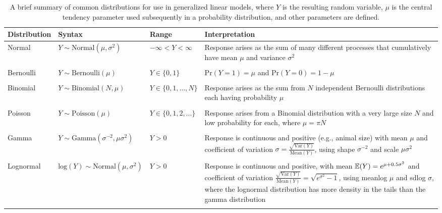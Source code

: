 \begin{table}
  \caption[List of common distributions]{A brief summary of common distributions for use in generalized linear models, where \(Y\) is the resulting random variable, \(\mu\) is the central tendency parameter used subsequently in a probability distribution, and other parameters are defined.}
\begin{center}
\begin{tabularx}{\textwidth}{ | X m{1.5in} X m{2in} | } 
  \hline
  Distribution & Syntax & Range & Interpretation \\ 
  \hline

  Normal & \( Y \sim \mathrm{Normal}(\mu,\sigma^2) \) & \( -\infty < Y < \infty \) & Response arises as the sum of many different processes that cumulatively have mean \(\mu\) and variance \(\sigma^2\) \\ & & & \\

  Bernoulli & \( Y \sim \mathrm{Bernoulli}(\mu) \) & \(Y \in \{0,1\} \) & \(\mathrm{Pr}(Y=1) = \mu\) and \(\mathrm{Pr}(Y=0) = 1-\mu\) \\ & & & \\

  Binomial & \( Y \sim \mathrm{Binomial}(N,\mu) \) & \(Y \in \{0,1,...,N\} \) & Response arises as the sum from \(N\) independent Bernoulli distributions each having probability \(\mu\) \\ & & & \\

  Poisson & \( Y \sim \mathrm{Poisson}(\mu) \) & \(Y \in \{0,1,2,...\} \) & Response arises from a Binomial distribution with a very large size \(N\) and low probability for each, where \(\mu = \pi N \) \\ & & & \\

  Gamma & \( Y \sim \mathrm{Gamma}(\sigma^{-2},\mu \sigma^2) \) & \( Y > 0 \) & Response is continuous and positive (e.g., animal size) with mean \(\mu\) and coefficient of variation \( \sigma =  \frac{\sqrt{\mathrm{Var}(Y)}}{\mathrm{Mean}(Y)} \), using shape \(\sigma^{-2}\) and scale \(\mu \sigma^2\) \\ & & & \\

  Lognormal & \( \mathrm{log}(Y) \sim \mathrm{Normal}( \mu,\sigma^2 ) \) & \( Y > 0 \) & Response is continuous and positive, with mean \(\operatorname{\mathbb{E}}(Y)=e^{\mu+0.5\sigma^2}\) and coefficient of variation \( \frac{\sqrt{\mathrm{Var}(Y)}}{\mathrm{Mean}(Y)} = \sqrt{e^{\sigma^2}-1} \), using meanlog \(\mu\) and sdlog \(\sigma\), where the lognormal distribution has more density in the tails than the gamma distribution \\ & & & \\


\end{tabularx}
\end{center}
\end{table}
